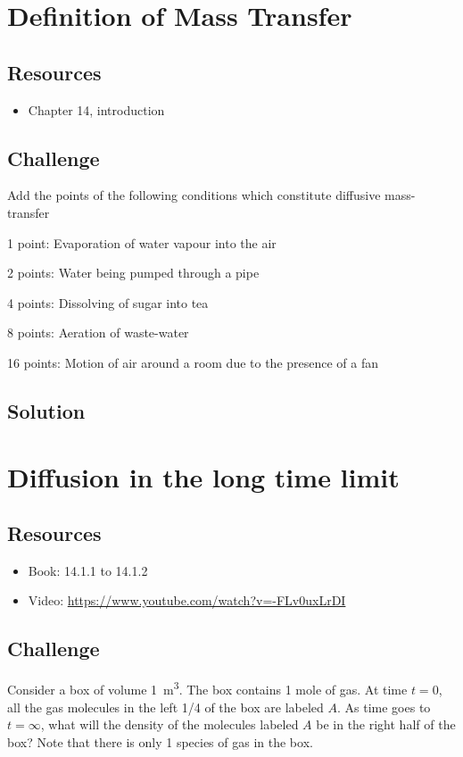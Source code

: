\newpage
\section{Definition of Mass Transfer}

\subsection*{Resources}
\begin{itemize}
    \item Chapter 14, introduction
\end{itemize}

\subsection*{Challenge}
Add the points of the following conditions which constitute diffusive mass-transfer

1 point: Evaporation of water vapour into the air

2 points: Water being pumped through a pipe

4 points: Dissolving of sugar into tea

8 points: Aeration of waste-water

16 points: Motion of air around a room due to the presence of a fan

\subsection*{Solution}




\newpage
\section{Diffusion in the long time limit}

\subsection*{Resources}
\begin{itemize}
    \item Book: 14.1.1 to 14.1.2
    \item Video: \url{https://www.youtube.com/watch?v=-FLv0uxLrDI}
\end{itemize}

\subsection*{Challenge}
Consider a box of volume \SI{1}{\cubic\meter}. The box contains 1 mole of gas. At time $t=0$, all the gas molecules in the left 1/4 of the box are labeled $A$. As time goes to $t=\infty$, what will the density of the molecules labeled $A$ be in the right half of the box? Note that there is only 1 species of gas in the box.

